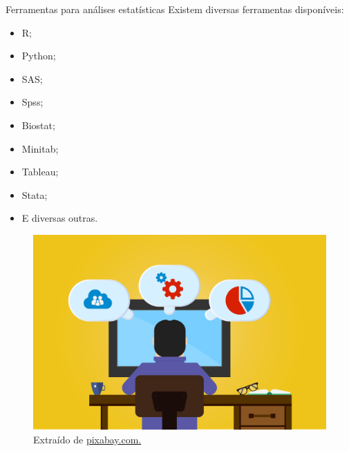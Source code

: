 \documentclass[
  ignorenonframetext,
  serif,
  professionalfont,
  usenames,
  dvipsnames,
  aspectratio = 169]{beamer}
\def\beginAHalfColumn{\begin{minipage}{0.49\textwidth}}%
\def\endColumns{\end{minipage}}%
\begin{document}
\begin{frame}{Ferramentas para análises estatísticas}
\protect\hypertarget{ferramentas-para-anuxe1lises-estatuxedsticas}{}
Existem diversas ferramentas disponíveis:

\beginAHalfColumn

\begin{itemize}
\item
  R;
\item
  Python;
\item
  SAS;
\item
  Spss;
\item
  Biostat;
\item
  Minitab;
\item
  Tableau;
\item
  Stata;
\item
  E diversas outras.
\end{itemize}

\endColumns
\beginAHalfColumn

\begin{figure}

{\centering \includegraphics[width=0.8\linewidth]{./img/programacao} 

}

\caption{Extraído de \href{https://cdn.pixabay.com/photo/2018/06/08/00/48/developer-3461405_960_720.png}{pixabay.com.}}\label{fig:unnamed-chunk-4}
\end{figure}

\endColumns
\end{frame}
\end{document}
